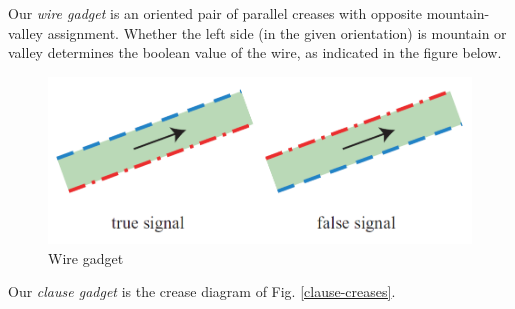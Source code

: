 \begin{definition}
  Our \emph{wire gadget} is an oriented pair of parallel creases with
  opposite mountain-valley assignment. Whether the left side (in the
  given orientation) is mountain or valley determines the boolean
  value of the wire, as indicated in the figure below.
  \begin{figure}[h!tbp]
    \includegraphics[width=.7\textwidth]{origami-data/wire}
    \caption{Wire gadget \cite{demaine-GFALOP-lecture}}
  \end{figure}
\end{definition}

\begin{definition}
  Our \emph{clause gadget} is the crease diagram of
  Fig. \ref{clause-creases}.
\end{definition}

